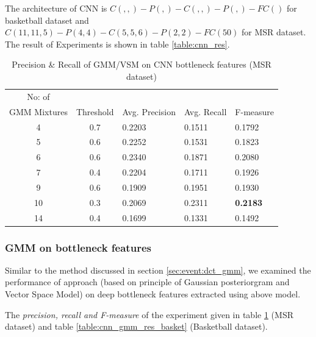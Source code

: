 The architecture of CNN is $C(, , )-P(, )-C(, , )-P(, )-FC()$ for basketball dataset and $C(11, 11, 5)-P(4,4)-C(5, 5, 6)-P(2,2)-FC(50)$ for MSR dataset. The result of Experiments is shown in table \ref{table:cnn_res}.

\begin{table}[h]
\centering
\begin{tabular}{|c|c|l|l|l|}
\hline
No: of &&&&\\
GMM Mixtures & Threshold & Avg. Precision & Avg. Recall & F-measure\\
\hline
\hline
 4 	&0.7 	&0.2203 	& 0.1511	&0.1792\\
 5 	&0.6 	&0.2252 	& 0.1531	&0.1823\\
 6 	&0.6 	&0.2340 	& 0.1871	&0.2080\\
 7 	&0.4 	&0.2204 	& 0.1711	&0.1926\\
 9 	&0.6 	&0.1909 	& 0.1951	&0.1930\\
10 	&0.3 	&0.2069 	& 0.2311	&\textbf{0.2183}\\
14 	&0.4 	&0.1699 	& 0.1331	&0.1492\\
\hline  
\end{tabular}
\caption[Event spotting using GMM/VSM on CNN(Gray,Frame diff,Edge) bottleneck features (MSR Action Dataset) ]{ Precision \& Recall  of GMM/VSM on CNN bottleneck features (MSR dataset)}
\label{table:cnn_gmm_res_msr}
\end{table} 

\subsubsection{GMM on bottleneck features}
Similar to the method discussed in section \ref{sec:event:dct_gmm}, we examined the performance of approach (based on principle of Gaussian posteriorgram and Vector Space Model) on deep bottleneck features extracted using above model. 

The \textit{precision, recall and F-measure} of the experiment given in table \ref{table:cnn_gmm_res_msr} (MSR dataset) and table \ref{table:cnn_gmm_res_basket} (Basketball dataset).

